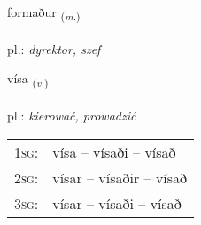 \documentclass[frontgrid, backgrid]{flacards}\usepackage[]{graphicx}\usepackage[]{xcolor}
\begin{document}
\renewcommand{\flhead}{\vskip5pt \fboxsep=0pt {\small\bfseries\footnotesize Nafnorð | rzeczownik}}
\renewcommand{\fcfoot}{\vskip5pt \fboxsep=0pt \hspace{2pt}{\small\bfseries\footnotesize 1K}}

\renewcommand{\blhead}{\vskip5pt {\small\bfseries\footnotesize Nafnorð | rzeczownik }}
\renewcommand{\bcfoot}{\vskip5pt \hspace{2pt}{\small\bfseries\footnotesize 1K}}


{formaður \small{\textsubscript{(\textit{m.})}} \\[1ex] %
\textphonetic{[fɔrmaðʏr]} \\
pl.: \emph{dyrektor, szef} \\  [2ex]
\renewcommand*{\arraystretch}{0.8}
}

\renewcommand{\flhead}{\vskip5pt \fboxsep=0pt {\small\bfseries\footnotesize Sagnorð | czasownik}}
\renewcommand{\fcfoot}{\vskip5pt \fboxsep=0pt \hspace{2pt}{\small\bfseries\footnotesize 1K}}

\renewcommand{\blhead}{\vskip5pt {\small\bfseries\footnotesize Sagnorð | czasownik }}
\renewcommand{\bcfoot}{\vskip5pt \hspace{2pt}{\small\bfseries\footnotesize 1K}}


{vísa \small{\textsubscript{(\textit{v.})}} \\[1ex] %
\textphonetic{[viːsa]} \\
pl.: \emph{kierować, prowadzić} \\  [2ex]
\renewcommand*{\arraystretch}{0.8}
\begin{tabular}{p{1cm}l}
\textsc{1sg}: & vísa -- vísaði -- vísað \\ 
\textsc{2sg}: & vísar -- vísaðir -- vísað \\ 
\textsc{3sg}: & vísar -- vísaði -- vísað \\ 
\end{tabular}
}
\end{document}
